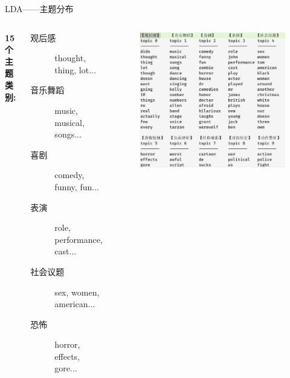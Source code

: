 \documentclass{beamer}
\begin{document}
\begin{frame}{LDA——主题分布}
    \begin{columns}
        \textbf{15个主题类别:}
        \begin{description}
            \item[观后感] thought, thing, lot...
            \item[音乐舞蹈] music, musical, songs...
            \item[喜剧] comedy, funny, fun...
            \item[表演] role, performance, cast...
            \item[社会议题] sex, women, american...
            \item[恐怖] horror, effects, gore...
        \end{description}

        \begin{figure}
            \includegraphics[width=\textwidth]{pic/topic.png}
        \end{figure}
    \end{columns}
\end{frame}
\end{document}
